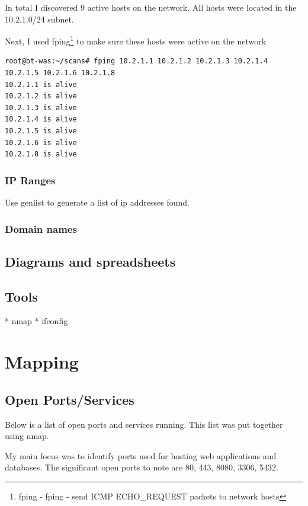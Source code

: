 \documentclass{article}
\begin{document}
In total I discovered 9 active hosts on the network. All hosts were 
located in the 10.2.1.0/24 subnet.

Next, I used fping\footnote{\label{fping}fping - fping - send ICMP ECHO\_REQUEST packets to network hosts} 
to make sure these hosts were active on the network

\begin{lstlisting}
root@bt-was:~/scans# fping 10.2.1.1 10.2.1.2 10.2.1.3 10.2.1.4 10.2.1.5 10.2.1.6 10.2.1.8
10.2.1.1 is alive
10.2.1.2 is alive
10.2.1.3 is alive
10.2.1.4 is alive
10.2.1.5 is alive
10.2.1.6 is alive
10.2.1.8 is alive
\end{lstlisting}


\subsubsection{IP Ranges}

Use genlist to generate a list of ip addresses found.

\subsubsection{Domain names}


\newpage
\subsection{Diagrams and spreadsheets}
\subsection{Tools}

* nmap
* ifconfig

\newpage
\section{Mapping}
\subsection{Open Ports/Services}

Below is a list of open ports and services running. This list was put together using nmap.


My main focus was to identify ports used for hosting web applications and databases. 
The significant open ports to note are 80, 443, 8080, 3306, 5432.
\end{document}
